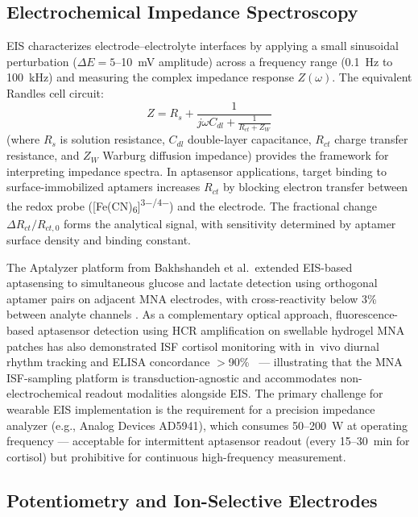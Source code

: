 \documentclass[review,1p]{elsarticle}
\begin{document}
\subsection{Electrochemical Impedance Spectroscopy}
\label{subsec:eis}

EIS characterizes electrode--electrolyte interfaces by applying a small sinusoidal perturbation ($\Delta E = 5$--10~mV amplitude) across a frequency range (0.1~Hz to 100~kHz) and measuring the complex impedance response $Z(\omega)$. The equivalent Randles cell circuit:
\begin{equation}
Z = R_s + \frac{1}{j\omega C_{dl} + \frac{1}{R_{ct} + Z_W}}
\label{eq:eis_randles}
\end{equation}
(where $R_s$ is solution resistance, $C_{dl}$ double-layer capacitance, $R_{ct}$ charge transfer resistance, and $Z_W$ Warburg diffusion impedance) provides the framework for interpreting impedance spectra. In aptasensor applications, target binding to surface-immobilized aptamers increases $R_{ct}$ by blocking electron transfer between the redox probe ([Fe(CN)\textsubscript{6}]\textsuperscript{3$-$/4$-$}) and the electrode. The fractional change $\Delta R_{ct}/R_{ct,0}$ forms the analytical signal, with sensitivity determined by aptamer surface density and binding constant.

The Aptalyzer platform from Bakhshandeh et al.\ extended EIS-based aptasensing to simultaneous glucose and lactate detection using orthogonal aptamer pairs on adjacent MNA electrodes, with cross-reactivity below 3\% between analyte channels \cite{Bakhshandeh2024}. As a complementary optical approach, fluorescence-based aptasensor detection using HCR amplification on swellable hydrogel MNA patches has also demonstrated ISF cortisol monitoring with in~vivo diurnal rhythm tracking and ELISA concordance $>$90\%~\cite{Zhou2025Cortisol} — illustrating that the MNA ISF-sampling platform is transduction-agnostic and accommodates non-electrochemical readout modalities alongside EIS. The primary challenge for wearable EIS implementation is the requirement for a precision impedance analyzer (e.g., Analog Devices AD5941), which consumes 50--200~\textmu{}W at operating frequency — acceptable for intermittent aptasensor readout (every 15--30~min for cortisol) but prohibitive for continuous high-frequency measurement.

\subsection{Potentiometry and Ion-Selective Electrodes}
\label{subsec:potentiometry}
\end{document}
